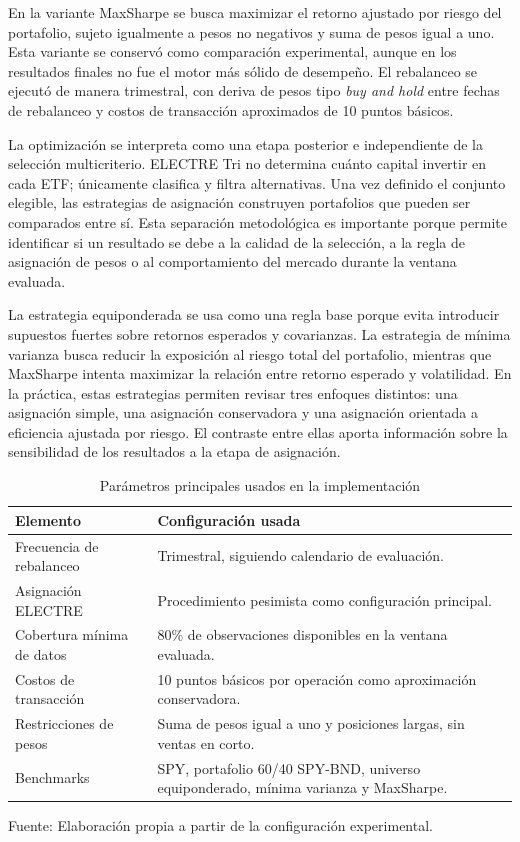 \documentclass[12pt,letterpaper]{article}
\newcommand{\fuente}[1]{\begin{center}\small Fuente: #1\end{center}}
\begin{document}
En la variante MaxSharpe se busca maximizar el retorno ajustado por riesgo del portafolio, sujeto igualmente a pesos no negativos y suma de pesos igual a uno. Esta variante se conservó como comparación experimental, aunque en los resultados finales no fue el motor más sólido de desempeño. El rebalanceo se ejecutó de manera trimestral, con deriva de pesos tipo \textit{buy and hold} entre fechas de rebalanceo y costos de transacción aproximados de 10 puntos básicos.

La optimización se interpreta como una etapa posterior e independiente de la selección multicriterio. ELECTRE Tri no determina cuánto capital invertir en cada ETF; únicamente clasifica y filtra alternativas. Una vez definido el conjunto elegible, las estrategias de asignación construyen portafolios que pueden ser comparados entre sí. Esta separación metodológica es importante porque permite identificar si un resultado se debe a la calidad de la selección, a la regla de asignación de pesos o al comportamiento del mercado durante la ventana evaluada.

La estrategia equiponderada se usa como una regla base porque evita introducir supuestos fuertes sobre retornos esperados y covarianzas. La estrategia de mínima varianza busca reducir la exposición al riesgo total del portafolio, mientras que MaxSharpe intenta maximizar la relación entre retorno esperado y volatilidad. En la práctica, estas estrategias permiten revisar tres enfoques distintos: una asignación simple, una asignación conservadora y una asignación orientada a eficiencia ajustada por riesgo. El contraste entre ellas aporta información sobre la sensibilidad de los resultados a la etapa de asignación.


\begin{table}[H]
\centering
\caption{Parámetros principales usados en la implementación}
\label{tab:parametros_implementacion}
\begin{tabular}{p{5cm}p{8cm}}
\toprule
\textbf{Elemento} & \textbf{Configuración usada} \\
\midrule
Frecuencia de rebalanceo & Trimestral, siguiendo calendario de evaluación. \\
Asignación ELECTRE & Procedimiento pesimista como configuración principal. \\
Cobertura mínima de datos & 80\% de observaciones disponibles en la ventana evaluada. \\
Costos de transacción & 10 puntos básicos por operación como aproximación conservadora. \\
Restricciones de pesos & Suma de pesos igual a uno y posiciones largas, sin ventas en corto. \\
Benchmarks & SPY, portafolio 60/40 SPY-BND, universo equiponderado, mínima varianza y MaxSharpe. \\
\bottomrule
\end{tabular}
\end{table}
\fuente{Elaboración propia a partir de la configuración experimental.}
\end{document}
